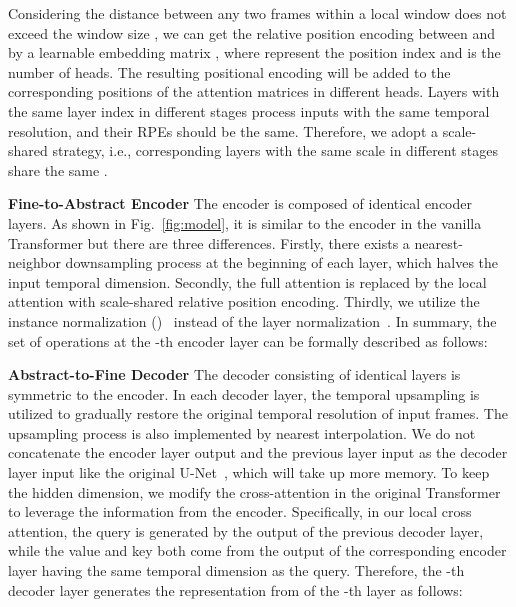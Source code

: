 \documentclass[letterpaper]{article} \usepackage[submission]{aaai23}  \usepackage{times}  \usepackage{helvet}  \usepackage{courier}  \usepackage[hyphens]{url}  \usepackage{graphicx} \urlstyle{rm} \def\UrlFont{\rm}  \usepackage{natbib}  \usepackage{caption} \frenchspacing  \setlength{\pdfpagewidth}{8.5in} \setlength{\pdfpageheight}{11in} \usepackage{algorithm}
\begin{document}
Considering the distance between any two frames within a local window does not exceed the window size , we can get the relative position encoding  between  and  by a learnable embedding matrix , where  represent the position index and  is the number of heads. The resulting positional encoding  will be added to the corresponding positions of the attention matrices in different heads. Layers with the same layer index in different stages process inputs with the same temporal resolution, and their RPEs should be the same. Therefore, we adopt a scale-shared strategy, i.e., corresponding layers with the same scale in different stages share the same . 


\textbf{Fine-to-Abstract Encoder}\quad 
The encoder is composed of  identical encoder layers. As shown in Fig.~\ref{fig:model}, it is similar to the encoder in the vanilla Transformer but there are three differences. Firstly, there exists a nearest-neighbor downsampling process at the beginning of each layer, which halves the input temporal dimension. Secondly, the full attention is replaced by the local attention with scale-shared relative position encoding. Thirdly, we utilize the instance normalization ()~\cite{ulyanov2016instance} instead of the layer normalization~\cite{layernorm}. In summary, the set of operations at the -th encoder layer can be formally described as follows: 
\begin{footnotesize}

\end{footnotesize}


\textbf{Abstract-to-Fine Decoder}\quad 
The decoder consisting of  identical layers is symmetric to the encoder. In each decoder layer, the temporal upsampling is utilized to gradually restore the original temporal resolution of input frames. The upsampling process is also implemented by nearest interpolation. We do not concatenate the encoder layer output and the previous layer input as the decoder layer input like the original U-Net~\cite{ron2015unet}, which will take up more memory. To keep the hidden dimension, we modify the cross-attention in the original Transformer to leverage the information from the encoder. Specifically, in our local cross attention, the query is generated by the output of the previous decoder layer, while the value and key both come from the output of the corresponding encoder layer having the same temporal dimension as the query. Therefore, the -th decoder layer generates the representation  from  of the -th layer as follows:
\begin{footnotesize}

\end{footnotesize}
\end{document}
